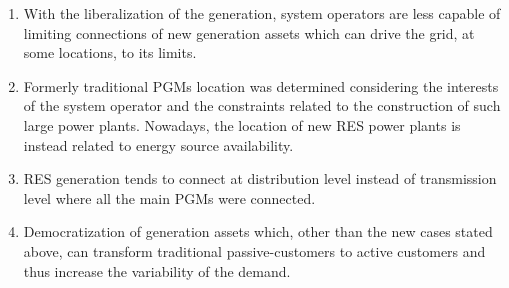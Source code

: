 \begin{enumerate}
\item With the liberalization of the generation, system operators are less capable of limiting
connections of new generation assets which can drive the grid, at some locations, to its
limits.
\item Formerly traditional PGMs location was determined considering the interests of the system
operator and the constraints related to the construction of such large power plants.
Nowadays, the location of new RES power plants is instead related to energy source availability.
\item RES generation tends to connect at distribution level instead of transmission level where
all the main PGMs were connected.
\item Democratization of generation assets which, other than the new cases stated above, can
transform traditional passive-customers to active customers and thus increase the variability
of the demand.

\end{enumerate}

